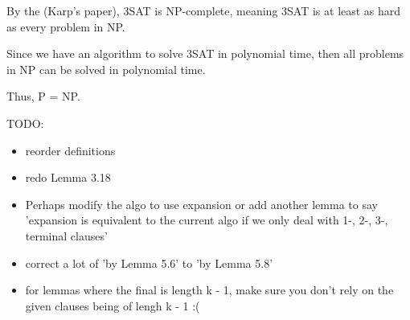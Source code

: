 \documentclass[manuscript]{acmart}
\begin{document}
    By the (Karp's paper), 3SAT is NP-complete, meaning 3SAT is at least
    as hard as every problem in NP.
    
    Since we have an algorithm to solve 3SAT in polynomial time, then all problems
    in NP can be solved in polynomial time.

    Thus, P = NP. 


    TODO:
    \begin{itemize}
        \item reorder definitions
        \item redo Lemma 3.18
        \item Perhaps modify the algo to use expansion or add another lemma
        to say 'expansion is equivalent to the current algo if we only deal with
        1-, 2-, 3-, terminal clauses'
        \item correct a lot of 'by Lemma 5.6' to 'by Lemma 5.8'
        \item for lemmas where the final is length k - 1, make sure you
        don't rely on the given clauses being of lengh k - 1 :(
    \end{itemize}
\end{document}
